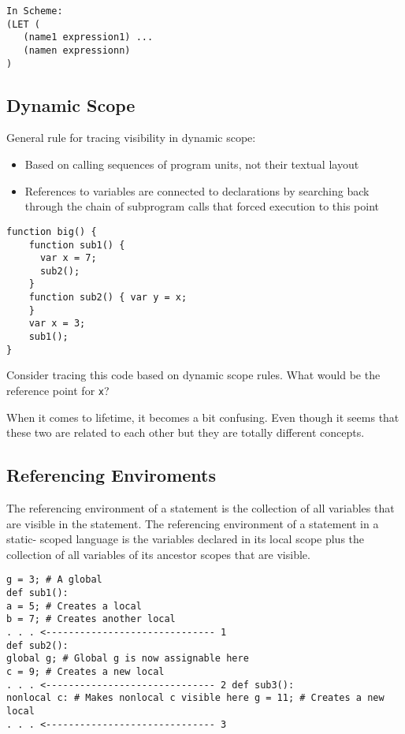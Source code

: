 \documentclass[11pt]{article}
\begin{document}
\begin{verbatim}
In Scheme:
(LET (
   (name1 expression1) ...
   (namen expressionn)
)
\end{verbatim}

\subsection{Dynamic Scope}
\label{sec:orgab133dc}

General rule for tracing visibility in dynamic scope:

\begin{itemize}
\item Based on calling sequences of program units, not their textual layout

\item References to variables are connected to declarations by searching back
through the chain of subprogram calls that forced execution to this point
\end{itemize}

\begin{verbatim}
function big() {
    function sub1() {
      var x = 7;
      sub2();
    }
    function sub2() { var y = x;
    }
    var x = 3;
    sub1();
}
\end{verbatim}

Consider tracing this code based on dynamic scope rules. What would be the
reference point for \texttt{x}?

When it comes to lifetime, it becomes a bit confusing. Even though it seems that
these two are related to each other but they are totally different concepts.


\subsection{Referencing Enviroments}
\label{sec:org230ce70}

The referencing environment of a statement is the collection of all variables
that are visible in the statement. The referencing environment of a statement in
a static- scoped language is the variables declared in its local scope plus the
collection of all variables of its ancestor scopes that are visible.

\begin{verbatim}
g = 3; # A global
def sub1():
a = 5; # Creates a local
b = 7; # Creates another local
. . . <------------------------------ 1
def sub2():
global g; # Global g is now assignable here
c = 9; # Creates a new local
. . . <------------------------------ 2 def sub3():
nonlocal c: # Makes nonlocal c visible here g = 11; # Creates a new local
. . . <------------------------------ 3
\end{verbatim}
\end{document}

